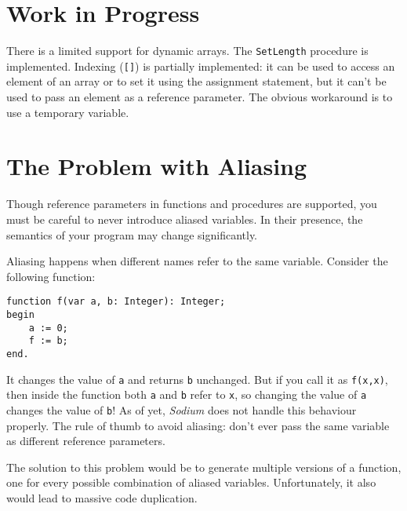 \documentclass [a4paper] {article}
\begin{document}
\section { Work in Progress }

There is a limited support for dynamic arrays. The \texttt{SetLength} procedure
is implemented. Indexing (\texttt{[]}) is partially implemented: it can be used
to access an element of an array or to set it using the assignment statement,
but it can't be used to pass an element as a reference parameter. The obvious
workaround is to use a temporary variable.

\section { The Problem with Aliasing }

Though reference parameters in functions and procedures are supported, you must
be careful to never introduce aliased variables. In their presence, the
semantics of your program may change significantly.

Aliasing happens when different names refer to the same variable. Consider the
following function:

\begin{lstlisting}
function f(var a, b: Integer): Integer;
begin
    a := 0;
    f := b;
end.
\end{lstlisting}

It changes the value of \texttt{a} and returns \texttt{b} unchanged. But if you
call it as \texttt{f(x,x)}, then inside the function both \texttt{a} and
\texttt{b} refer to \texttt{x}, so changing the value of \texttt{a} changes the
value of \texttt{b}! As of yet, \emph{Sodium} does not handle this behaviour
properly. The rule of thumb to avoid aliasing: don't ever pass the same variable
as different reference parameters.

The solution to this problem would be to generate multiple versions of a
function, one for every possible combination of aliased variables.
Unfortunately, it also would lead to massive code duplication.
\end{document}
